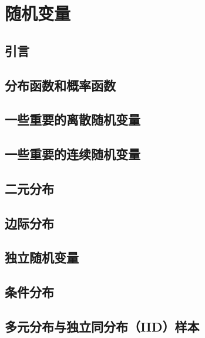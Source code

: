 \chapter{随机变量}

\section{引言}

\pending

\section{分布函数和概率函数}

\pending

\section{一些重要的离散随机变量}

\pending

\section{一些重要的连续随机变量}

\pending

\section{二元分布}

\pending

\section{边际分布}

\pending

\section{独立随机变量}

\pending

\section{条件分布}

\pending

\section{多元分布与独立同分布（IID）样本}

